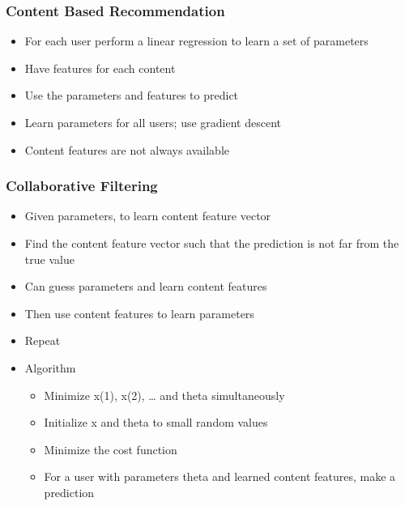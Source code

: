 \documentclass[]{article}
\providecommand{\tightlist}{%
  \setlength{\itemsep}{0pt}\setlength{\parskip}{0pt}}
\begin{document}
\hypertarget{content-based-recommendation}{%
\subsubsection{Content Based
Recommendation}\label{content-based-recommendation}}

\begin{itemize}
\tightlist
\item
  For each user perform a linear regression to learn a set of parameters
\item
  Have features for each content
\item
  Use the parameters and features to predict
\item
  Learn parameters for all users; use gradient descent
\item
  Content features are not always available
\end{itemize}

\hypertarget{collaborative-filtering}{%
\subsubsection{Collaborative Filtering}\label{collaborative-filtering}}

\begin{itemize}
\tightlist
\item
  Given parameters, to learn content feature vector
\item
  Find the content feature vector such that the prediction is not far
  from the true value
\end{itemize}

\begin{itemize}
\tightlist
\item
  Can guess parameters and learn content features
\item
  Then use content features to learn parameters
\item
  Repeat
\item
  Algorithm

  \begin{itemize}
  \tightlist
  \item
    Minimize x(1), x(2), \ldots{} and theta simultaneously
  \item
    Initialize x and theta to small random values
  \item
    Minimize the cost function
  \item
    For a user with parameters theta and learned content features, make
    a prediction
  \end{itemize}
\end{itemize}
\end{document}
